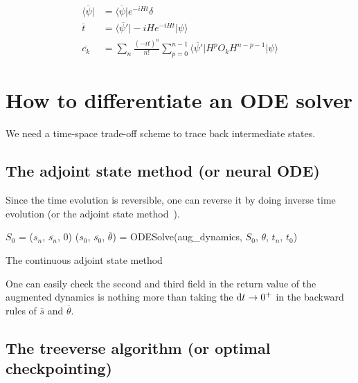 \documentclass{article}
\theoremstyle{definition}
\begin{document}
\begin{align}
    \overline{\langle\psi|} &= \overline{\langle\psi|}e^{-iHt}\delta\\
    \overline{t} &= \overline{\langle\psi'|}-iHe^{-iHt}|\psi\rangle\\
    \overline{c_k} &= \sum_n \frac{(-it)^n}{n!}\sum_{p=0}^{n-1} \overline{\langle\psi'|}H^p O_k H^{n-p-1}|\psi\rangle
\end{align}

\section{How to differentiate an ODE solver}
We need a time-space trade-off scheme to trace back intermediate states.
\subsection{The adjoint state method (or neural ODE)}
Since the time evolution is reversible, one can reverse it by doing inverse time evolution (or the adjoint state method~\cite{Plessix2006,Chen2018}).

\begin{algorithm}
    \SetAlgoLined
    \DontPrintSemicolon
        $S_0$ = ($s_n$, $\overline{s_n}$, $0$) 
        ($s_0$, $\overline{s_0}$, $\overline{\theta}$) = ODESolve(aug\_dynamics, $S_0$, $\theta$, $t_n$, $t_0$) 
    \caption{The continuous adjoint state method}\label{alg:adjointstate}
\end{algorithm}

One can easily check the second and third field in the return value of the augmented dynamics is nothing more than taking the ${\rm d}t\rightarrow 0^+$ in the backward rules of $\overline{s}$ and $\overline{\theta}$.

\subsection{The treeverse algorithm (or optimal checkpointing)}
\end{document}
